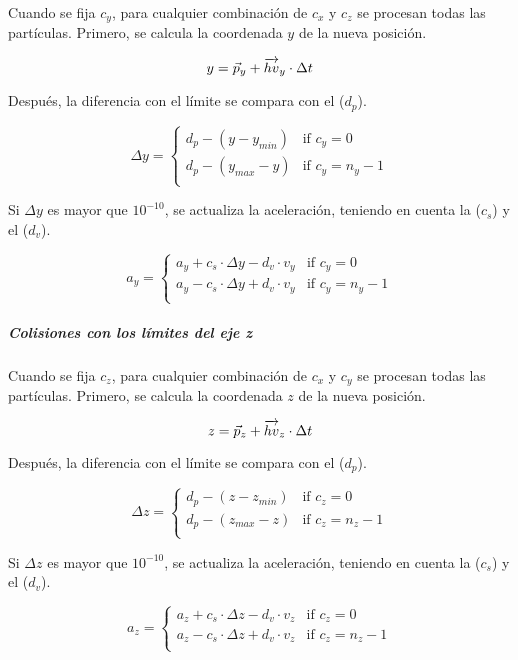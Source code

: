 Cuando se fija $c_y$, para cualquier combinación de $c_x$ y $c_z$ se
procesan todas las partículas. Primero, se calcula la coordenada $y$ de la 
nueva posición.

\[
y = \vec{p}_y + \overrightarrow{hv}_y \cdot \Delta t \\
\]

Después, la diferencia con el límite se compara con el  ($d_p$).

\[
\Delta y = 
\begin{cases}
d_p - (y - y_{min}) & \text{if } c_y = 0\\
d_p - (y_{max} - y) & \text{if } c_y = n_y -1\\
\end{cases}
\]

Si $\Delta y$ es mayor que $10^{-10}$, se actualiza la aceleración,
teniendo en cuenta la  ($c_s$) y el
 ($d_v$).

\[
a_y = 
\begin{cases}
  a_y + c_s \cdot \Delta y - d_v \cdot v_y & \text{if  } c_y = 0\\
  a_y - c_s \cdot \Delta y + d_v \cdot v_y & \text{if  } c_y = n_y-1\\
\end{cases}
\]

\subparagraph{Colisiones con los límites del eje z}

Cuando se fija $c_z$, para cualquier combinación de $c_x$ y $c_y$ se
procesan todas las partículas. Primero, se calcula la coordenada $z$ de la 
nueva posición.

\[
z = \vec{p}_z + \overrightarrow{hv}_z \cdot \Delta t \\
\]

Después, la diferencia con el límite se compara con el  ($d_p$).

\[
\Delta z = 
\begin{cases}
d_p - (z - z_{min}) & \text{if } c_z = 0\\
d_p - (z_{max} - z) & \text{if } c_z = n_z -1\\
\end{cases}
\]

Si $\Delta z$ es mayor que $10^{-10}$, se actualiza la aceleración,
teniendo en cuenta la  ($c_s$) y el
 ($d_v$).

\[
a_z = 
\begin{cases}
  a_z + c_s \cdot \Delta z - d_v \cdot v_z & \text{if  } c_z = 0\\
  a_z - c_s \cdot \Delta z + d_v \cdot v_z & \text{if  } c_z = n_z-1\\
\end{cases}
\]
